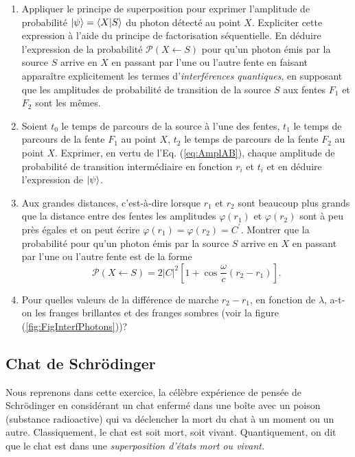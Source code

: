 \begin{enumerate}
\item Appliquer le principe de superposition pour exprimer l'amplitude de
probabilité $\vert\psi\rangle =\langle X\vert S\rangle$ du photon détecté au point $X$.
Expliciter cette expression à l'aide du principe de factorisation séquentielle.
En déduire l'expression de la probabilité $\mathcal{P}(X\leftarrow S)$ pour
qu'un photon émis par la source $S$ arrive en $X$ en passant par l'une ou
l'autre fente en faisant apparaître explicitement les termes
d'\emph{interférences quantiques}, en supposant que les amplitudes de
probabilité de transition de la source $S$ aux fentes $F_1$ et $F_2$ sont
les mêmes.

\item Soient $t_{0}$ le temps de parcours de la source à l'une des fentes,
$t_1$ le temps de parcours de la fente $F_1$ au point $X$, $t_2$ le
temps de parcours de la fente $F_2$ au point $X$. Exprimer, en vertu de
l'Eq. (\ref{eq:AmplAB}), chaque amplitude de probabilité de transition
intermédiaire en fonction $r_{i}$ et $t_{i}$ et en déduire l'expression de
$\vert\psi\rangle $.

\item Aux grandes distances, c'est-à-dire lorsque $r_1$ et $r_2$ sont
beaucoup plus grands que la distance entre des fentes les amplitudes
$\varphi(r_1)$ et $\varphi(r_2)$ sont à peu près égales et on peut écrire
$\varphi(r_1)=\varphi(r_2)=C^{\prime}$. Montrer que la probabilité pour
qu'un photon émis par la source $S$ arrive en $X$ en passant par l'une ou
l'autre fente est de la forme%
\begin{equation}
\mathcal{P}(X\leftarrow S)=2|C|^{2}\left[1+\cos\frac{\omega}{c}(r_2-r_1)
\right].
\end{equation}


\item Pour quelles valeurs de la différence de marche $r_2-r_1$, en
fonction de $\lambda$, a-t-on les franges brillantes et des franges sombres
(voir la figure (\ref{fig:FigInterfPhotons}))?
\end{enumerate}

\subsection{Chat de Schrödinger}

Nous reprenons dans cette exercice, la célèbre expérience de pensée de
Schrödinger en considérant un chat enfermé dans une boîte avec un poison
(substance radioactive) qui va déclencher la mort du chat à un moment ou un
autre. Classiquement, le chat est soit mort, soit vivant. Quantiquement, on
dit que le chat est dans une \emph{superposition d'états mort ou vivant.}


